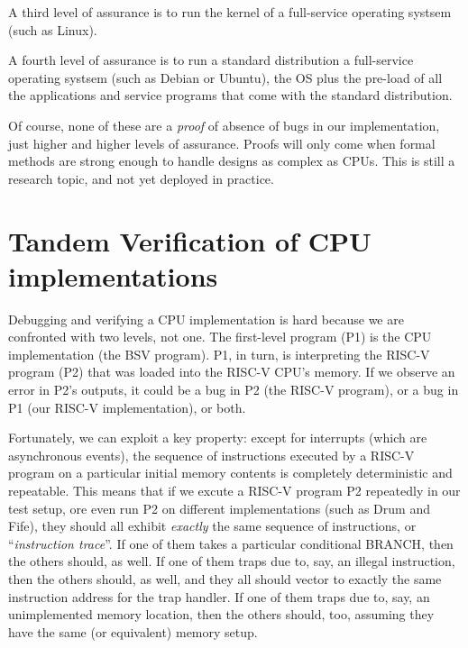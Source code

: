 A third level of assurance is to run the kernel of a full-service
operating systsem (such as Linux).

A fourth level of assurance is to run a standard distribution a
full-service operating systsem (such as Debian or Ubuntu), {\ie} the
OS plus the pre-load of all the applications and service programs that
come with the standard distribution.

Of course, none of these are a \emph{proof} of absence of bugs in our
implementation, just higher and higher levels of assurance.  Proofs
will only come when formal methods are strong enough to handle designs
as complex as CPUs.  This is still a research topic, and not yet
deployed in practice.


\section{Tandem Verification of CPU implementations}

\label{Sec_Tandem_Verification}


Debugging and verifying a CPU implementation is hard because we are
confronted with two levels, not one.  The first-level program (P1) is
the CPU implementation (the BSV program).  P1, in turn, is
interpreting the RISC-V program (P2) that was loaded into the RISC-V
CPU's memory. If we observe an error in P2's outputs, it could be a
bug in P2 (the RISC-V program), or a bug in P1 (our RISC-V
implementation), or both.

Fortunately, we can exploit a key property: except for interrupts
(which are asynchronous events), the sequence of instructions executed
by a RISC-V program on a particular initial memory contents is
completely deterministic and repeatable.  This means that if we excute
a RISC-V program P2 repeatedly in our test setup, ore even run P2 on
different implementations (such as Drum and Fife), they should all
exhibit \emph{exactly} the same sequence of instructions, or
``\emph{instruction trace}''.  If one of them takes a particular
conditional BRANCH, then the others should, as well.  If one of them
traps due to, say, an illegal instruction, then the others should, as
well, and they all should vector to exactly the same instruction
address for the trap handler.  If one of them traps due to, say, an
unimplemented memory location, then the others should, too, assuming
they have the same (or equivalent) memory setup.


